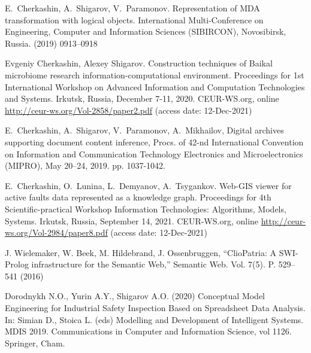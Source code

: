 \documentclass[
]{ceurart}
\begin{document}
\begin{thebibliography}{99}
 E.~Cherkashin, A.~Shigarov, V.~Paramonov. Representation of MDA transformation with logical objects. International Multi-Conference on Engineering, Computer and Information Sciences (SIBIRCON), Novosibirsk, Russia. (2019) 0913--0918 

 Evgeniy Cherkashin, Alexey Shigarov. Construction techniques of Baikal microbiome research information-computational environment. Proceedings for 1st International Workshop on Advanced Information and Computation Technologies and Systems. Irkutsk, Russia, December 7-11, 2020. CEUR-WS.org, online \url{http://ceur-ws.org/Vol-2858/paper2.pdf} (access date: 12-Dec-2021)

 E.~Cherkashin, A.~Shigarov, V.~Paramonov, A.~Mikhailov, Digital archives supporting document content inference, Procs. of 42-nd International Convention on Information and Communication Technology Electronics and Microelectronics (MIPRO), May 20–24, 2019. pp. 1037-1042. 

 E.~Cherkashin, O.~Lunina, L.~Demyanov, A.~Tsygankov. Web-GIS viewer for active faults data represented as a knowledge graph. Proceedings for 4th Scientific-practical Workshop Information Technologies: Algorithms, Models, Systems. Irkutsk, Russia, September 14, 2021. CEUR-WS.org, online \url{http://ceur-ws.org/Vol-2984/paper8.pdf} (access date: 12-Dec-2021)

 J. Wielemaker, W. Beek, M. Hildebrand, J. Ossenbruggen, ``ClioPatria: A
  SWI-Prolog infrastructure for the Semantic Web,'' Semantic Web.
  Vol. 7(5). P. 529--541 (2016) 

 Dorodnykh N.O., Yurin A.Y., Shigarov A.O. (2020) Conceptual Model Engineering for Industrial Safety Inspection Based on Spreadsheet Data Analysis. In: Simian D., Stoica L. (eds) Modelling and Development of Intelligent Systems. MDIS 2019. Communications in Computer and Information Science, vol 1126. Springer, Cham. 

\end{thebibliography}

\end{document}
